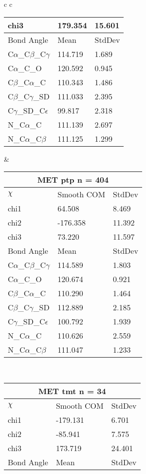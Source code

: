 \begin{longtable}{ c c }
\begin{tabular}{ l l l }
  chi3 & 179.354 & 15.601 \\ \midrule
  Bond Angle   & Mean     & StdDev \\ \midrule
  C$\alpha$\_C$\beta$\_C$\gamma$ & 114.719 & 1.689\\
  C$\alpha$\_C\_O & 120.592 & 0.945\\
  C$\beta$\_C$\alpha$\_C & 110.343 & 1.486\\
  C$\beta$\_C$\gamma$\_SD & 111.033 & 2.395\\
  C$\gamma$\_SD\_C$\epsilon$ & 99.817 & 2.318\\
  N\_C$\alpha$\_C & 111.139 & 2.697\\
  N\_C$\alpha$\_C$\beta$ & 111.125 & 1.299\\
  \bottomrule
  \end{tabular}
  &
  \begin{tabular}{ l l l }
  \toprule
  \multicolumn{3}{c}{MET \textbf{ptp} n = 404} \\ \toprule
  $\chi$       & Smooth COM & StdDev \\ \midrule
  chi1 & 64.508 & 8.469 \\ 
  chi2 & -176.358 & 11.392 \\ 
  chi3 & 73.220 & 11.597 \\ \midrule
  Bond Angle   & Mean     & StdDev \\ \midrule
  C$\alpha$\_C$\beta$\_C$\gamma$ & 114.589 & 1.803\\
  C$\alpha$\_C\_O & 120.674 & 0.921\\
  C$\beta$\_C$\alpha$\_C & 110.290 & 1.464\\
  C$\beta$\_C$\gamma$\_SD & 112.889 & 2.185\\
  C$\gamma$\_SD\_C$\epsilon$ & 100.792 & 1.939\\
  N\_C$\alpha$\_C & 110.626 & 2.559\\
  N\_C$\alpha$\_C$\beta$ & 111.047 & 1.233\\
  \bottomrule
  \end{tabular}
  \\
  \begin{tabular}{ l l l }
  \toprule
  \multicolumn{3}{c}{MET \textbf{tmt} n = 34} \\ \toprule
  $\chi$       & Smooth COM & StdDev \\ \midrule
  chi1 & -179.131 & 6.701 \\ 
  chi2 & -85.941 & 7.575 \\ 
  chi3 & 173.719 & 24.401 \\ \midrule
  Bond Angle   & Mean     & StdDev \\ \midrule

\end{tabular}
\end{longtable}
